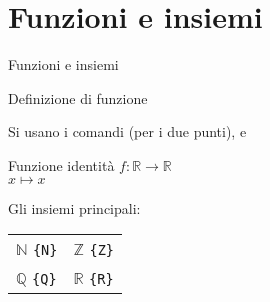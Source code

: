 \section{Funzioni e insiemi}
  \begin{frame}{Funzioni e insiemi}

	Definizione di funzione

	Si usano i comandi \texttt{\colon} (per i due punti), \texttt{\to} e \texttt{\mapsto}

    \begin{esempio}{Funzione identità}
	  \centering
	  $f \colon \mathbb{R} \to \mathbb{R}$ \\
	  $x \mapsto x$
    \end{esempio}

	Gli insiemi principali:

	\begin{table}[h!]
	\begin{tabular}{l l}
	\hline
	$\mathbb{N}$ \texttt{\mathbb\{N\}} & $\mathbb{Z}$ \texttt{\mathbb\{Z\}} \\
	$\mathbb{Q}$ \texttt{\mathbb\{Q\}} & $\mathbb{R}$ \texttt{\mathbb\{R\}} \\
	\hline
	\end{tabular}
	\end{table}

\end{frame}
